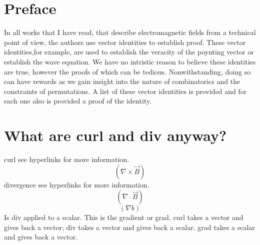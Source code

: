 \documentclass[12pt]{article}
\begin{document}
\section{Preface}
In all works that I have read, that describe electromagnetic fields from a technical point of view, the authors use vector identities to establish proof. These vector identities,for example, are used to establish the veracity of the poynting vector or establish the wave equation. 
We have no intristic reason to believe these identities are true, however the proofs of which can be tedious. Nonwithstanding, doing so can have rewards as we gain insight into the nature of combinatorics and the constraints of permutations.
A list of these vector identities is provided and for each one also is provided a proof of the identity.
\section{What are curl and div anyway?}
curl see hyperlinks for more information.
\begin{equation}
(\nabla \times \vec{B} )
\end{equation}
divergence see hyperlinks for more information.
\begin{equation}
(\nabla \cdot \vec{B} )
\end{equation}
\begin{equation}
(\nabla b )
\end{equation}
Is div applied to a scalar. This is the gradient or grad.
curl takes a vector and gives back a vector; div takes a vector and gives back a scalar.
grad takes a scalar and gives back a vector.
\end{document}
